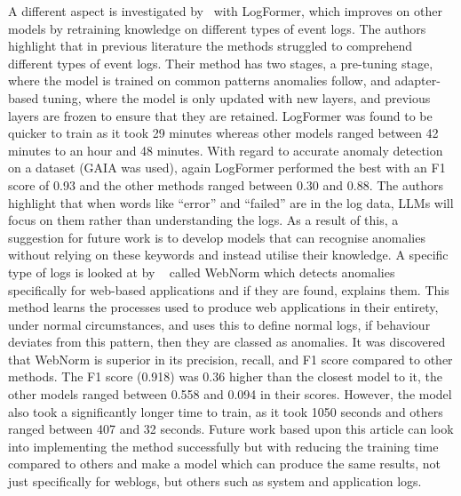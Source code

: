 A different aspect is investigated by~\cite{guo2024logformer} with LogFormer, which improves on other models by retraining knowledge on different types of event logs. The authors highlight that in previous literature the methods struggled to comprehend different types of event logs. Their method has two stages, a pre-tuning stage, where the model is trained on common patterns anomalies follow, and adapter-based tuning, where the model is only updated with new layers, and previous layers are frozen to ensure that they are retained. LogFormer was found to be quicker to train as it took 29 minutes whereas other models ranged between 42 minutes to an hour and 48 minutes. With regard to accurate anomaly detection on a dataset (GAIA was used), again LogFormer performed the best with an F1 score of 0.93 and the other methods ranged between 0.30 and 0.88. The authors highlight that when words like ``error'' and ``failed'' are in the log data, LLMs will focus on them rather than understanding the logs. As a result of this, a suggestion for future work is to develop models that can recognise anomalies without relying on these keywords and instead utilise their knowledge. A specific type of logs is looked at by ~\cite{liao2024detecting} called WebNorm which detects anomalies specifically for web-based applications and if they are found, explains them. This method learns the processes used to produce web applications in their entirety, under normal circumstances, and uses this to define normal logs, if behaviour deviates from this pattern, then they are classed as anomalies. It was discovered that WebNorm is superior in its precision, recall, and F1 score compared to other methods. The F1 score (0.918) was 0.36 higher than the closest model to it, the other models ranged between 0.558 and 0.094 in their scores. However, the model also took a significantly longer time to train, as it took 1050 seconds and others ranged between 407 and 32 seconds. Future work based upon this article can look into implementing the method successfully but with reducing the training time compared to others and make a model which can produce the same results, not just specifically for weblogs, but others such as system and application logs.

